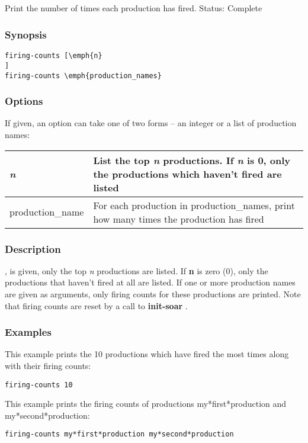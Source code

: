 \subsection{}
\label{firing-counts}
Print the number of times each production has fired. 
 Status: Complete
\subsubsection*{Synopsis}
\begin{verbatim}
firing-counts [\emph{n}
]
firing-counts \emph{production_names}
\end{verbatim}
\subsubsection*{Options}
 If given, an option can take one of two forms -- an integer or a list of production names: 
\begin{tabular}{|l|l|}
\hline 
\emph{n}
 & List the top \emph{n}
 productions. If \emph{n}
 is 0, only the productions which haven't fired are listed  \\
 \hline 
 production\_name  & For each production in production\_names, print how many times the production has fired  \\
 \hline 
\end{tabular}
\subsubsection*{Description}
, is given, only the top \emph{n}
 productions are listed. If \textbf{n}
 is zero (0), only the productions that haven't fired at all are listed. If one or more production names are given as arguments, only firing counts for these productions are printed. 
 Note that firing counts are reset by a call to \textbf{init-soar}
. 
\subsubsection*{Examples}
 This example prints the 10 productions which have fired the most times along with their firing counts: \begin{verbatim}
firing-counts 10
\end{verbatim}
 This example prints the firing counts of productions my*first*production and my*second*production: \begin{verbatim}
firing-counts my*first*production my*second*production
\end{verbatim}
